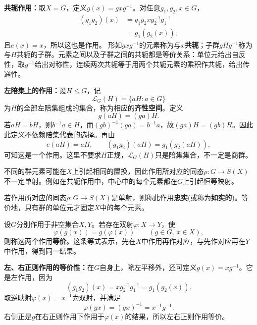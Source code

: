 \begin{example}
\label{p2:concept:c2-l971}\textbf{共轭作用：}取$X=G$，定义$g(x)=gxg^{-1}$。对任意$g_1,g_2,x\in G$，
\begin{align*}
(g_1g_2)(x)
&=g_1g_2xg_2^{-1}g_1^{-1}\\
&=g_1(g_2(x)),
\end{align*}
且$e(x)=x$，所以这也是作用。
\label{p2:concept:c2-l978}形如$gxg^{-1}$的元素称为与$x$\textbf{共轭}；子群$gHg^{-1}$称为与$H$共轭的子群。元素之间以及子群之间的共轭都是等价关系：单位元给出自反性，取$g^{-1}$给出对称性，连续两次共轭等于用两个共轭元素的乘积作共轭，给出传递性。
\end{example}

\begin{example}
\textbf{左陪集上的作用：}设$H\leq G$，记
\[
\mathcal L_G(H)=\{aH:a\in G\}
\]
\label{p2:concept:c2-l986}为$H$的全部左陪集组成的集合，称为相应的\textbf{齐性空间}。定义
\[
g(aH)=(ga)H.
\]
若$aH=bH$，则$b^{-1}a\in H$，而$(gb)^{-1}(ga)=b^{-1}a$，故$(ga)H=(gb)H$。因此此定义不依赖陪集代表的选择。再由
\[
e(aH)=aH,\qquad
(g_1g_2)(aH)=g_1(g_2(aH)),
\]
可知这是一个作用。这里不要求$H$正规，$\mathcal L_G(H)$只是陪集集合，不一定是商群。
\end{example}

不同的群元素可能在$X$上引起相同的置换，因此作用所对应的同态$\rho:G\to S(X)$不一定单射。例如在共轭作用中，中心中的每个元素都在$G$上引起恒等映射。

\begin{definition}
\label{p2:concept:c2-l1001}若作用所对应的同态$\rho:G\to S(X)$是单射，则称此作用\textbf{忠实}(或称为\textbf{如实的})。等价地，只有群的单位元才固定$X$中的每个元素。
\end{definition}
\begin{definition}
\label{p2:concept:c2-l1004}设$G$分别作用于非空集合$X,Y$。若存在双射$\varphi:X\to Y$，使
\[
\varphi(g(x))=g(\varphi(x))
\qquad(g\in G,\ x\in X),
\]
则称这两个作用\textbf{等价}。这条等式表示，先在$X$中作用再作对应，与先作对应再在$Y$中作用，得到同一结果。
\end{definition}

\begin{example}
\textbf{左、右正则作用的等价性：}在$G$自身上，除左平移外，还可定义$g(x)=xg^{-1}$。它是左作用，因为
\[
(g_1g_2)(x)=xg_2^{-1}g_1^{-1}
=g_1(g_2(x)).
\]
取逆映射$\varphi(x)=x^{-1}$为双射，并满足
\[
\varphi(gx)=(gx)^{-1}=x^{-1}g^{-1}.
\]
右侧正是$g$在右正则作用下作用于$\varphi(x)$的结果，所以左右正则作用等价。
\end{example}

